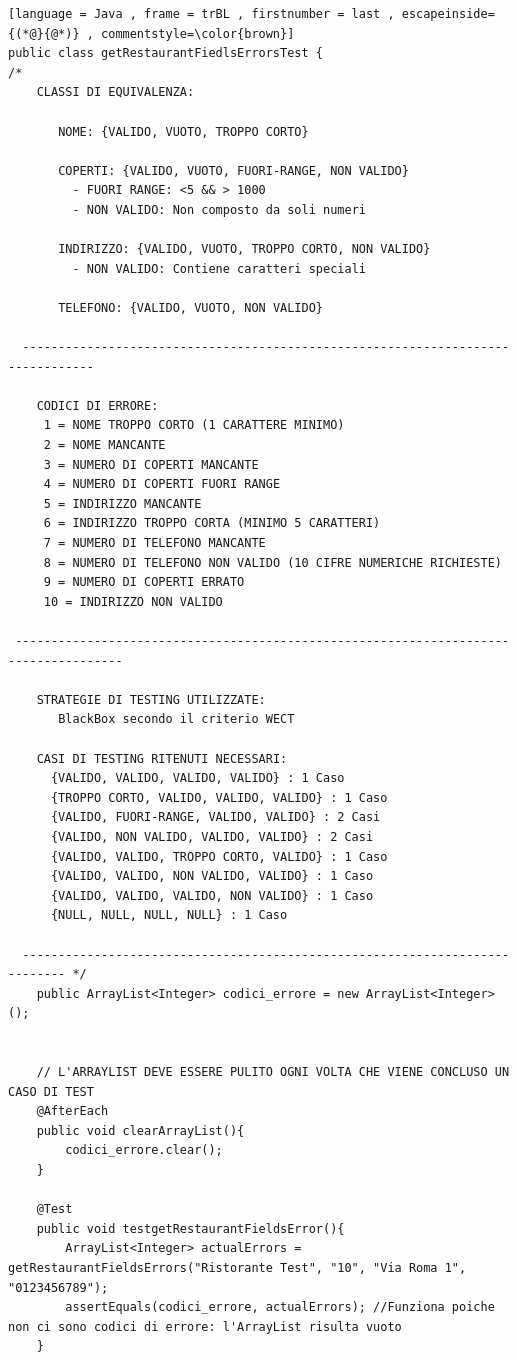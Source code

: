 \begin{lstlisting}[language = Java , frame = trBL , firstnumber = last , escapeinside={(*@}{@*)} , commentstyle=\color{brown}]
public class getRestaurantFiedlsErrorsTest {
/*
    CLASSI DI EQUIVALENZA:
 
       NOME: {VALIDO, VUOTO, TROPPO CORTO}
 
       COPERTI: {VALIDO, VUOTO, FUORI-RANGE, NON VALIDO}
         - FUORI RANGE: <5 && > 1000
         - NON VALIDO: Non composto da soli numeri
 
       INDIRIZZO: {VALIDO, VUOTO, TROPPO CORTO, NON VALIDO}
         - NON VALIDO: Contiene caratteri speciali
 
       TELEFONO: {VALIDO, VUOTO, NON VALIDO}
 
  --------------------------------------------------------------------------------
 
    CODICI DI ERRORE:
     1 = NOME TROPPO CORTO (1 CARATTERE MINIMO)
     2 = NOME MANCANTE
     3 = NUMERO DI COPERTI MANCANTE
     4 = NUMERO DI COPERTI FUORI RANGE
     5 = INDIRIZZO MANCANTE
     6 = INDIRIZZO TROPPO CORTA (MINIMO 5 CARATTERI)
     7 = NUMERO DI TELEFONO MANCANTE
     8 = NUMERO DI TELEFONO NON VALIDO (10 CIFRE NUMERICHE RICHIESTE)
     9 = NUMERO DI COPERTI ERRATO
     10 = INDIRIZZO NON VALIDO
 
 -------------------------------------------------------------------------------------
 
    STRATEGIE DI TESTING UTILIZZATE:
       BlackBox secondo il criterio WECT
 
    CASI DI TESTING RITENUTI NECESSARI:
      {VALIDO, VALIDO, VALIDO, VALIDO} : 1 Caso
      {TROPPO CORTO, VALIDO, VALIDO, VALIDO} : 1 Caso
      {VALIDO, FUORI-RANGE, VALIDO, VALIDO} : 2 Casi
      {VALIDO, NON VALIDO, VALIDO, VALIDO} : 2 Casi
      {VALIDO, VALIDO, TROPPO CORTO, VALIDO} : 1 Caso
      {VALIDO, VALIDO, NON VALIDO, VALIDO} : 1 Caso
      {VALIDO, VALIDO, VALIDO, NON VALIDO} : 1 Caso
      {NULL, NULL, NULL, NULL} : 1 Caso
 
  ---------------------------------------------------------------------------- */
    public ArrayList<Integer> codici_errore = new ArrayList<Integer>();


    // L'ARRAYLIST DEVE ESSERE PULITO OGNI VOLTA CHE VIENE CONCLUSO UN CASO DI TEST
    @AfterEach
    public void clearArrayList(){
        codici_errore.clear();
    }

    @Test
    public void testgetRestaurantFieldsError(){
        ArrayList<Integer> actualErrors = getRestaurantFieldsErrors("Ristorante Test", "10", "Via Roma 1", "0123456789");
        assertEquals(codici_errore, actualErrors); //Funziona poiche non ci sono codici di errore: l'ArrayList risulta vuoto
    }


\end{lstlisting}
